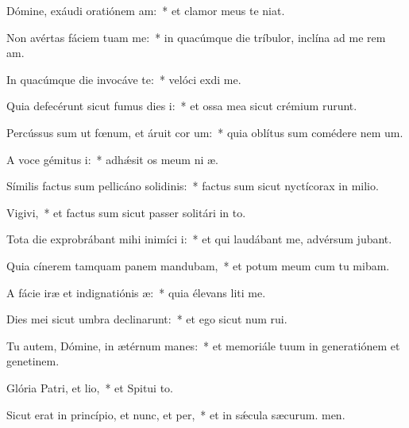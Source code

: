 \item Dómine, exáudi oratiónem am:~* et clamor meus  te niat.
\item Non avértas fáciem tuam  me:~* in quacúmque die tríbulor, inclína ad me rem am.
\item In quacúmque die invocáve te:~* velóci exdi me.
\item Quia defecérunt sicut fumus dies i:~* et ossa mea sicut crémium rurunt.
\item Percússus sum ut fœnum, et áruit cor um:~* quia oblítus sum comédere nem um.
\item A voce gémitus i:~* adhǽsit os meum ni æ.
\item Símilis factus sum pellicáno solidinis:~* factus sum sicut nyctícorax in milio.
\item Vigivi,~* et factus sum sicut passer solitári in to.
\item Tota die exprobrábant mihi inimíci i:~* et qui laudábant me, advérsum  jubant.
\item Quia cínerem tamquam panem mandubam,~* et potum meum cum tu mibam.
\item A fácie iræ et indignatiónis æ:~* quia élevans liti me.
\item Dies mei sicut umbra declinarunt:~* et ego sicut num rui.
\item Tu autem, Dómine, in ætérnum manes:~* et memoriále tuum in generatiónem et genetinem.
\item Glória Patri, et lio,~* et Spitui to.
\item Sicut erat in princípio, et nunc, et per,~* et in sǽcula sæcurum. men.
